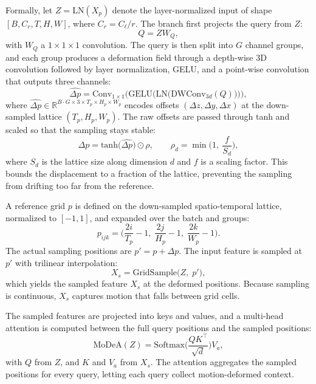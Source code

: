 Formally, let $Z = \mathrm{LN}(X_p)$ denote the layer-normalized input of
shape $[B, C_r, T, H, W]$, where $C_r = C_\ell / r$. The branch first projects
the query from $Z$:
\begin{equation}
  Q = Z W_Q,
\end{equation}
with $W_Q$ a $1\times1\times1$ convolution. The query is then split into
$G$ channel groups, and each group produces a deformation field through a
depth-wise 3D convolution followed by layer normalization, GELU, and a
point-wise convolution that outputs three channels:
\begin{equation}
  \widehat{\Delta p} = \mathrm{Conv}_{1\times1}\Big(\mathrm{GELU}\big(
      \mathrm{LN}\big(\mathrm{DWConv}_{3d}(Q)\big)\big)\Big),
\end{equation}
where $\widehat{\Delta p} \in \mathbb{R}^{B\cdot G \times 3 \times T_p \times H_p \times W_p}$
encodes offsets $(\Delta z, \Delta y, \Delta x)$ at the down-sampled lattice
$(T_p, H_p, W_p)$. The raw offsets are passed through tanh and scaled so that
the sampling stays stable:
\begin{equation}
  \Delta p = \mathrm{tanh}\big(\widehat{\Delta p}\big) \odot \rho,
  \qquad
  \rho_d = \min\Big(1,\ \frac{f}{S_d}\Big),
\end{equation}
where $S_d$ is the lattice size along dimension $d$ and $f$ is a scaling factor.
This bounds the displacement to a fraction of the lattice, preventing the
sampling from drifting too far from the reference.

A reference grid $p$ is defined on the down-sampled spatio-temporal lattice,
normalized to $[-1, 1]$, and expanded over the batch and groups:
\begin{equation}
  p_{ijk} = \Big(\frac{2 i}{T_p}-1,\; \frac{2 j}{H_p}-1,\; \frac{2 k}{W_p}-1\Big).
\end{equation}
The actual sampling positions are $p' = p + \Delta p$. The input feature is
sampled at $p'$ with trilinear interpolation:
\begin{equation}
  X_s = \mathrm{GridSample}\big(Z,\; p'\big),
\end{equation}
which yields the sampled feature $X_s$ at the deformed positions. Because
sampling is continuous, $X_s$ captures motion that falls between grid cells.

The sampled features are projected into keys and values, and a multi-head
attention is computed between the full query positions and the sampled
positions:
\begin{equation}
  \mathrm{MoDeA}(Z) = \mathrm{Softmax}\Big(\frac{Q K^\top}{\sqrt{d}}\Big) V_a,
\end{equation}
with $Q$ from $Z$, and $K$ and $V_a$ from $X_s$. The attention aggregates the
sampled positions for every query, letting each query collect motion-deformed
context.

